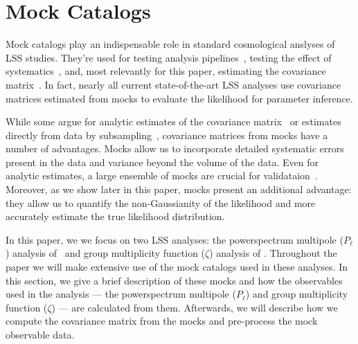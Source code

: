 \documentclass[12pt, letterpaper, preprint]{aastex}
\newcommand{\Beut}{\citetalias{beutler2017}}
\newcommand{\Sinh}{\citetalias{sinha2017a}}
\begin{document}
\section{Mock Catalogs}
Mock catalogs play an indispensable role in standard cosmological 
anslyses of LSS studies. They're used for testing analysis 
pipelines~\citep[][]{beutler2017, grieb2017, tinkerinpreparation}, 
testing the effect of systematics~\citep{guo2012, vargas-magana2014, hahn2017, pinol2017, ross2017}, 
and, most relevantly for this paper, estimating the covariance 
matrix~\citep[][]{parkinson2012, kazin2014, grieb2017, alam2017, beutler2017, sinha2017a}. 
In fact, nearly all current state-of-the-art LSS analyses use
covariance matrices estimated from mocks to evaluate the likelihood 
for parameter inference. 

While some argue for analytic estimates of the covariance 
matrix~\citep[e.g.][]{mohammed2017} or estimates directly from data
by subsampling~\citep[e.g.][]{norberg2009}, covariance matrices 
from mocks have a number of advantages. Mocks allow us 
to incorporate detailed systematic errors present in the 
data and variance beyond the volume of the data. Even for analytic 
estimates, a large ensemble of mocks are crucial for validataion~\citep[\emph{e.g.}][]{slepian2017}. 
Moreover, as we show later in this paper, mocks present an
additional advantage: they allow us to 
quantify the non-Gaussianity of the likelihood and more accurately 
estimate the true likelihood distribution. 

In this paper, we we focus on two LSS analyses: the powerspectrum 
multipole ($P_\ell$) analysis of \Beut~and group multiplicity 
function ($\zeta$) analysis of \Sinh. Throughout the paper we will 
make extensive use of the mock catalogs used in these analyses. 
In this section, we give a brief description of these mocks and how 
the observables used in the analysis --- the powerspectrum 
multipole ($P_\ell$) and group multiplicity function ($\zeta$) ---
are calculated from them. Afterwards, we will describe how we compute 
the covariance matrix from the mocks and pre-process the mock observable
data.
\end{document}
